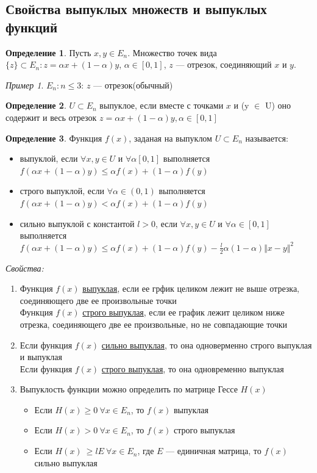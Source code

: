 \documentclass[oneside]{book}
\theoremstyle{plain}
\theoremstyle{remark}
\newtheorem*{examp}{Пример}
\theoremstyle{definition}
\newtheorem*{definition}{Определение}
\begin{document}
\subsection{Свойства выпуклых множеств и выпуклых функций}
\label{sec:orgec6702a}
\begin{definition}
Пусть \(x, y \in E_n\). Множество точек вида \(\{z\} \subset E_n: z = \alpha x + (1 - \alpha)y\), \(\alpha \in [0, 1]\), \(z\) --- отрезок, соединяющий \(x\) и \(y\).
\end{definition}
\begin{examp}
\(E_n: n \le 3\): \(z\) --- отрезок(обычный)
\end{examp}
\begin{definition}
\(U \subset E_n\) выпуклое, если вместе с точками \(x\) и (y \(\in\) U) оно содержит и весь отрезок \(z = \alpha x + (1 - \alpha)y, \alpha \in [0, 1]\)
\end{definition}
\begin{definition}
Функция \(f(x)\), заданая на выпуклом \(U \subset E_n\) называется:
\begin{itemize}
\item выпуклой, если \(\forall x, y \in U\) и \(\forall \alpha [0, 1]\) выполняется \(f(\alpha x + (1 - \alpha)y) \le \alpha f(x) + (1- \alpha)f(y)\)
\item строго выпуклой, если \(\forall \alpha \in (0, 1)\) выполняется \(f(\alpha x + (1 - \alpha)y) < \alpha f(x) + (1-\alpha)f(y)\)
\item сильно выпуклой с константой \(l > 0\), если \(\forall x, y \in U\) и \(\forall \alpha \in [0, 1]\) выполняется \(f(\alpha x + (1 - \alpha)y) \le \alpha f(x) + (1- \alpha) f(y) - \frac{l}{2}\alpha(1 - \alpha)\Vert x - y \Vert^2\)
\end{itemize}
\end{definition}
\emph{Свойства:}
\begin{enumerate}
\item Функция \(f(x)\) \uline{выпуклая}, если ее грфик целиком лежит не выше отрезка, соединяющего две ее произвольные точки \\
Функция \(f(x)\) \uline{строго выпуклая}, если ее график лежит целиком ниже отрезка, соединяющего две ее произвольные, но не совпадающие точки
\item Если функция \(f(x)\) \uline{сильно выпуклая}, то она одноверменно строго выпуклая и выпуклая \\
Если функция \(f(x)\) \uline{строго выпуклая}, то она одновременно выпуклая
\item Выпуклость функции можно определить по матрице Гессе \(H(x)\)
\begin{itemize}
\item Если \(H(x) \ge 0\ \forall x \in E_n\), то \(f(x)\) выпуклая
\item Если \(H(x) > 0\ \forall x\in E_n\), то \(f(x)\) строго выпуклая
\item Если \(H(x)\ \ge lE\ \forall x \in E_n\), где \(E\) --- единичная матрица, то \(f(x)\) сильно выпуклая
\end{itemize}
\end{enumerate}
\end{document}
